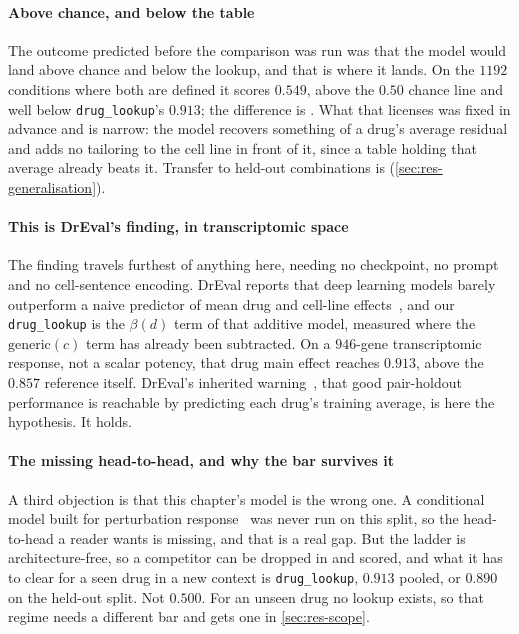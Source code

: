 \paragraph{Above chance, and below the table} The outcome predicted before the
comparison was run was that the model would land above chance and below the
lookup, and that is where it lands. On the $\num{1192}$ conditions where both are
defined it scores $0.549$, above the $0.50$ chance line and well below
\texttt{drug\_lookup}'s $0.913$; the difference is
. What that licenses was fixed in advance and is
narrow: the model recovers something of a drug's average residual and adds no
tailoring to the cell line in front of it, since a table holding that average
already beats it. Transfer to held-out combinations is \notestablished
(\cref{sec:res-generalisation}). 

\paragraph{This is DrEval's finding, in transcriptomic space} The finding travels
furthest of anything here, needing no checkpoint, no prompt and no cell-sentence
encoding. DrEval reports that deep learning models barely outperform a naive
predictor of mean drug and cell-line effects~\cite{dreval}, and our
\texttt{drug\_lookup} is
the $\beta(d)$ term of that additive model, measured where the
$\textrm{generic}(c)$ term has already been
subtracted. On a $946$-gene transcriptomic response, not a scalar potency, that drug
main effect reaches $0.913$, above the $0.857$ reference itself. DrEval's
inherited warning~\cite{partin}, that good pair-holdout performance is reachable
by predicting each drug's training average, is here the hypothesis. It holds.

\paragraph{The missing head-to-head, and why the bar survives it} A third
objection is that this chapter's model is the wrong one. A conditional model
built for perturbation response~\cite{cpa,scgen,gears} was never run on this
split, so the head-to-head a reader wants is missing, and that is a real gap. But
the ladder is architecture-free, so a competitor can be dropped in and scored,
and what it has to clear for a seen drug in a new context is
\texttt{drug\_lookup}, $0.913$ pooled, or $0.890$ on the held-out split. Not
$0.500$. For an unseen drug no lookup exists, so that regime needs a different
bar and gets one in \cref{sec:res-scope}.

